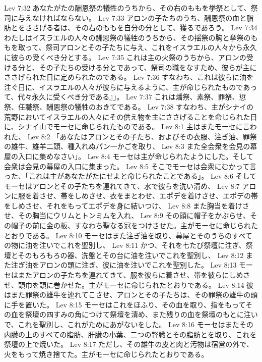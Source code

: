 Lev 7:32  あなたがたの酬恩祭の犠牲のうちから、その右のももを挙祭として、祭司に与えなければならない。
Lev 7:33  アロンの子たちのうち、酬恩祭の血と脂肪とをささげる者は、その右のももを自分の分として、獲るであろう。
Lev 7:34  わたしはイスラエルの人々の酬恩祭の犠牲のうちから、その揺祭の胸と挙祭のももを取って、祭司アロンとその子たちに与え、これをイスラエルの人々から永久に彼らの受くべき分とする。
Lev 7:35  これは主の火祭のうちから、アロンの受ける分と、その子たちの受ける分とであって、祭司の職をなすため、彼らが主にささげられた日に定められたのである。
Lev 7:36  すなわち、これは彼らに油を注ぐ日に、イスラエルの人々が彼らに与えるように、主が命じられたものであって、代々永久に受くべき分である』」。
Lev 7:37  これは燔祭、素祭、罪祭、愆祭、任職祭、酬恩祭の犠牲のおきてである。
Lev 7:38  すなわち、主がシナイの荒野においてイスラエルの人々にその供え物を主にささげることを命じられた日に、シナイ山でモーセに命じられたものである。
Lev 8:1  主はまたモーセに言われた、
Lev 8:2  「あなたはアロンとその子たち、およびその衣服、注ぎ油、罪祭の雄牛、雄羊二頭、種入れぬパン一かごを取り、
Lev 8:3  また全会衆を会見の幕屋の入口に集めなさい」。
Lev 8:4  モーセは主が命じられたようにした。そして会衆は会見の幕屋の入口に集まった。
Lev 8:5  そこでモーセは会衆にむかって言った、「これは主があなたがたにせよと命じられたことである」。
Lev 8:6  そしてモーセはアロンとその子たちを連れてきて、水で彼らを洗い清め、
Lev 8:7  アロンに服を着させ、帯をしめさせ、衣をまとわせ、エポデを着けさせ、エポデの帯をしめさせ、それをもってエポデを身に結いつけ、
Lev 8:8  また胸当を着けさせ、その胸当にウリムとトンミムを入れ、
Lev 8:9  その頭に帽子をかぶらせ、その帽子の前に金の板、すなわち聖なる冠をつけさせた。主がモーセに命じられたとおりである。
Lev 8:10  モーセはまた注ぎ油を取り、幕屋とそのうちのすべての物に油を注いでこれを聖別し、
Lev 8:11  かつ、それを七たび祭壇に注ぎ、祭壇とそのもろもろの器、洗盤とその台に油を注いでこれを聖別し、
Lev 8:12  また注ぎ油をアロンの頭に注ぎ、彼に油を注いでこれを聖別した。
Lev 8:13  モーセはまたアロンの子たちを連れてきて、服を彼らに着させ、帯を彼らにしめさせ、頭巾を頭に巻かせた。主がモーセに命じられたとおりである。
Lev 8:14  彼はまた罪祭の雄牛を連れてこさせ、アロンとその子たちは、その罪祭の雄牛の頭に手を置いた。
Lev 8:15  モーセはこれをほふり、その血を取り、指をもってその血を祭壇の四すみの角につけて祭壇を清め、また残りの血を祭壇のもとに注いで、これを聖別し、これがためにあがないをした。
Lev 8:16  モーセはまたその内臓の上のすべての脂肪、肝臓の小葉、二つの腎臓とその脂肪とを取り、これを祭壇の上で焼いた。
Lev 8:17  ただし、その雄牛の皮と肉と汚物は宿営の外で、火をもって焼き捨てた。主がモーセに命じられたとおりである。
